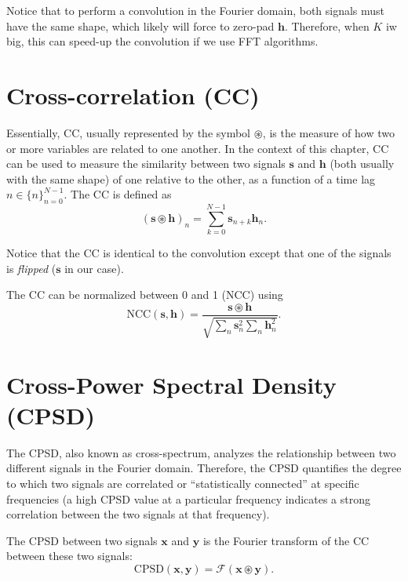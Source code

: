 Notice that to perform a convolution in the Fourier domain, both
signals must have the same shape, which likely will force to zero-pad
$\mathbf{h}$. Therefore, when $K$ iw big, this can speed-up the
convolution if we use \gls{FFT} algorithms.


\section{Cross-correlation (CC)}
\label{sec:cross-correlation}

Essentially, \gls{CC}, usually represented by the symbol
$\circledast$, is the measure of how two or more variables are related
to one another. In the context of this chapter, \gls{CC} can be used
to measure the similarity between two signals $\mathbf{s}$ and
$\mathbf{h}$ (both usually with the same shape) of one relative to the
other, as a function of a time lag $n\in\{n\}_{n=0}^{N-1}$. The
\gls{CC} is defined as
\begin{equation}
  (\mathbf{s}\circledast\mathbf{h})_n=\sum_{k=0}^{N-1}{\mathbf{s}}_{n+k} \mathbf{h}_n.
  \label{eq:cross-correlation}
\end{equation}

Notice that the \gls{CC} is identical to the convolution except that
one of the signals is \emph{flipped} ($\mathbf{s}$ in our case).

The \gls{CC} can be normalized between 0 and 1 (\gls{NCC}) using
\begin{equation}
  \text{NCC}(\mathbf{s},\mathbf{h})=\frac{{\mathbf{s}\circledast\mathbf{h}}}{\sqrt{\sum_n \mathbf{s}_n^2 \sum_n \mathbf{h}_n^2}}.
\end{equation}


\section{Cross-Power Spectral Density (CPSD)}
\label{sec:CPSD}

The \gls{CPSD}, also known as cross-spectrum, analyzes the
relationship between two different signals in the Fourier
domain. Therefore, the \gls{CPSD} quantifies the degree to which two
signals are correlated or ``statistically connected'' at specific
frequencies (a high \gls{CPSD} value at a particular frequency
indicates a strong correlation between the two signals at that
frequency).

The \gls{CPSD} between two signals $\mathbf{x}$ and $\mathbf{y}$ is
the Fourier transform of the \gls{CC} between these two
signals:
\begin{equation}
  \text{CPSD}(\mathbf{x},\mathbf{y})=\mathcal{F}({\mathbf{x}\circledast\mathbf{y}}).
\end{equation}

